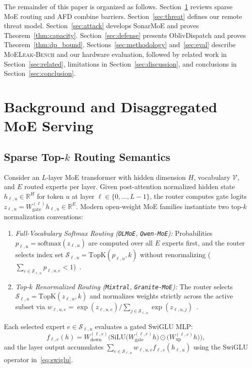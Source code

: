 \documentclass[10pt,journal,compsoc]{IEEEtran}
\def\SM{SonarMoE}%
\def\OD{OblivDispatch}%
\theoremstyle{definition}
\theoremstyle{remark}
\newcommand{\SM}{\textsc{SonarMoE}}
\newcommand{\OD}{\textsc{OblivDispatch}}
\newcommand{\MLB}{\textsc{MoELeak-Bench}}
\begin{document}
The remainder of this paper is organized as follows. Section~\ref{sec:background} reviews sparse MoE routing and AFD combine barriers. Section~\ref{sec:threat} defines our remote threat model. Section~\ref{sec:attack} develops \SM{} and proves Theorem~\ref{thm:capacity}. Section~\ref{sec:defense} presents \OD{} and proves Theorem~\ref{thm:dp_bound}. Sections~\ref{sec:methodology} and~\ref{sec:eval} describe \MLB{} and our hardware evaluation, followed by related work in Section~\ref{sec:related}, limitations in Section~\ref{sec:discussion}, and conclusions in Section~\ref{sec:conclusion}.

\section{Background and Disaggregated MoE Serving}\label{sec:background}

\subsection{Sparse Top-$k$ Routing Semantics}
Consider an $L$-layer MoE transformer with hidden dimension $H$, vocabulary $\mathcal{V}$, and $E$ routed experts per layer. Given post-attention normalized hidden state $h_{\ell, u} \in \mathbb{R}^H$ for token $u$ at layer $\ell \in \{0, \dots, L-1\}$, the router computes gate logits $z_{\ell, u} = W_{\mathrm{gate}}^{(\ell)} h_{\ell, u} \in \mathbb{R}^E$. Modern open-weight MoE families instantiate two top-$k$ normalization conventions:
\begin{enumerate}
  \item \emph{Full-Vocabulary Softmax Routing (\texttt{OLMoE}, \texttt{Qwen-MoE}):} Probabilities $p_{\ell, u} = \mathrm{softmax}(z_{\ell, u})$ are computed over all $E$ experts first, and the router selects index set $\mathcal{S}_{\ell, u} = \mathrm{TopK}(p_{\ell, u}, k)$ without renormalizing ($\sum_{e \in \mathcal{S}_{\ell, u}} p_{\ell, u, e} < 1$)~\cite{muennighoff2025olmoe,yang2024qwen2moe}.
  \item \emph{Top-$k$ Renormalized Routing (\texttt{Mixtral}, \texttt{Granite-MoE}):} The router selects $\mathcal{S}_{\ell, u} = \mathrm{TopK}(z_{\ell, u}, k)$ and normalizes weights strictly across the active subset via $w_{\ell, u, e} = \exp(z_{\ell, u, e}) / \sum_{j \in \mathcal{S}_{\ell, u}} \exp(z_{\ell, u, j})$~\cite{jiang2024mixtral,gale2023megablocks}.
\end{enumerate}
Each selected expert $e \in \mathcal{S}_{\ell, u}$ evaluates a gated SwiGLU MLP:
\begin{equation}\label{eq:swiglu}
  f_{\ell, e}(h) = W_{\mathrm{down}}^{(\ell, e)} \Big( \mathrm{SiLU}\!\big(W_{\mathrm{gate}}^{(\ell, e)} h\big) \odot \big(W_{\mathrm{up}}^{(\ell, e)} h\big) \Big),
\end{equation}
and the layer output accumulates $\sum_{e \in \mathcal{S}_{\ell, u}} w_{\ell, u, e} f_{\ell, e}(h_{\ell, u})$ using the SwiGLU operator in~\eqref{eq:swiglu}.
\end{document}
